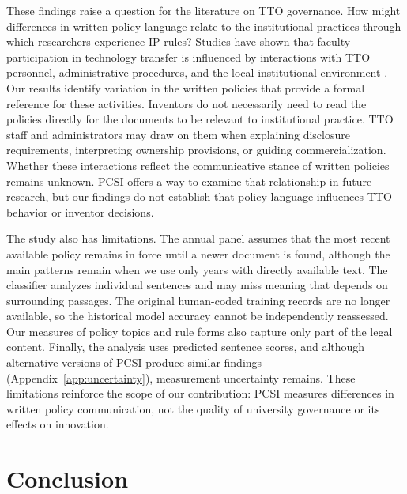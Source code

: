 \documentclass[11pt]{article}
\begin{document}
These findings raise a question for the literature on TTO governance. How might differences in written policy language relate to the institutional practices through which researchers experience IP rules? Studies have shown that faculty participation in technology transfer is influenced by interactions with TTO personnel, administrative procedures, and the local institutional environment \citep{owensmith2001patent,jensen2003disclosure,siegel2003assessing,bercovitz2008academic}. Our results identify variation in the written policies that provide a formal reference for these activities. Inventors do not necessarily need to read the policies directly for the documents to be relevant to institutional practice. TTO staff and administrators may draw on them when explaining disclosure requirements, interpreting ownership provisions, or guiding commercialization. Whether these interactions reflect the communicative stance of written policies remains unknown. PCSI offers a way to examine that relationship in future research, but our findings do not establish that policy language influences TTO behavior or inventor decisions.

The study also has limitations. The annual panel assumes that the most recent available policy remains in force until a newer document is found, although the main patterns remain when we use only years with directly available text. The classifier analyzes individual sentences and may miss meaning that depends on surrounding passages. The original human-coded training records are no longer available, so the historical model accuracy cannot be independently reassessed. Our measures of policy topics and rule forms also capture only part of the legal content. Finally, the analysis uses predicted sentence scores, and although alternative versions of PCSI produce similar findings (Appendix~\ref{app:uncertainty}), measurement uncertainty remains. These limitations reinforce the scope of our contribution: PCSI measures differences in written policy communication, not the quality of university governance or its effects on innovation.


\section{Conclusion}\label{sec:conclusion}
\end{document}
